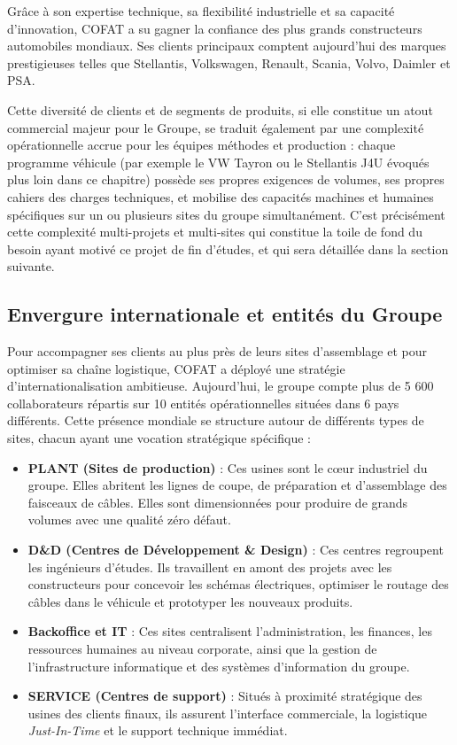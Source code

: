 Grâce à son expertise technique, sa flexibilité industrielle et sa capacité d'innovation, COFAT a su gagner la confiance des plus grands constructeurs automobiles mondiaux. Ses clients principaux comptent aujourd'hui des marques prestigieuses telles que Stellantis, Volkswagen, Renault, Scania, Volvo, Daimler et PSA.

Cette diversité de clients et de segments de produits, si elle constitue un atout commercial majeur pour le Groupe, se traduit également par une complexité opérationnelle accrue pour les équipes méthodes et production : chaque programme véhicule (par exemple le VW Tayron ou le Stellantis J4U évoqués plus loin dans ce chapitre) possède ses propres exigences de volumes, ses propres cahiers des charges techniques, et mobilise des capacités machines et humaines spécifiques sur un ou plusieurs sites du groupe simultanément. C'est précisément cette complexité multi-projets et multi-sites qui constitue la toile de fond du besoin ayant motivé ce projet de fin d'études, et qui sera détaillée dans la section suivante.

\subsection{Envergure internationale et entités du Groupe}
Pour accompagner ses clients au plus près de leurs sites d'assemblage et pour optimiser sa chaîne logistique, COFAT a déployé une stratégie d'internationalisation ambitieuse. Aujourd'hui, le groupe compte plus de 5 600 collaborateurs répartis sur 10 entités opérationnelles situées dans 6 pays différents. Cette présence mondiale se structure autour de différents types de sites, chacun ayant une vocation stratégique spécifique :

\begin{itemize}
    \item \textbf{PLANT (Sites de production)} : Ces usines sont le cœur industriel du groupe. Elles abritent les lignes de coupe, de préparation et d'assemblage des faisceaux de câbles. Elles sont dimensionnées pour produire de grands volumes avec une qualité zéro défaut.
    \item \textbf{D\&D (Centres de Développement \& Design)} : Ces centres regroupent les ingénieurs d'études. Ils travaillent en amont des projets avec les constructeurs pour concevoir les schémas électriques, optimiser le routage des câbles dans le véhicule et prototyper les nouveaux produits.
    \item \textbf{Backoffice et IT} : Ces sites centralisent l'administration, les finances, les ressources humaines au niveau corporate, ainsi que la gestion de l'infrastructure informatique et des systèmes d'information du groupe.
    \item \textbf{SERVICE (Centres de support)} : Situés à proximité stratégique des usines des clients finaux, ils assurent l'interface commerciale, la logistique \textit{Just-In-Time} et le support technique immédiat.
\end{itemize}

